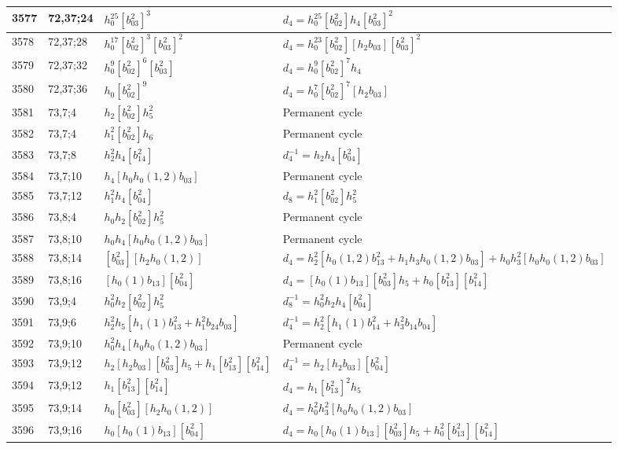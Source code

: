 \documentclass{article}
\begin{document}
\begin{longtable}{|l|l|>{\raggedright\arraybackslash}p{6cm}|>{\raggedright\arraybackslash}p{6cm}|}
\hline
3577 & 72,37;24 & $h_0^{25}[b_{03}^2]^3$ &$d_{4}=h_0^{25}[b_{02}^2]h_4[b_{03}^2]^2$\\
\hline
3578 & 72,37;28 & $h_0^{17}[b_{02}^2]^3[b_{03}^2]^2$ &$d_{4}=h_0^{23}[b_{02}^2][h_2b_{03}][b_{03}^2]^2$\\
\hline
3579 & 72,37;32 & $h_0^9[b_{02}^2]^6[b_{03}^2]$ &$d_{4}=h_0^9[b_{02}^2]^7h_4$\\
\hline
3580 & 72,37;36 & $h_0[b_{02}^2]^9$ &$d_{4}=h_0^7[b_{02}^2]^7[h_2b_{03}]$\\
\hline
3581 & 73,7;4 & $h_2[b_{02}^2]h_5^2$ & Permanent cycle\\
3582 & 73,7;4 & $h_1^2[b_{02}^2]h_6$ & Permanent cycle\\
\hline
3583 & 73,7;8 & $h_2^2h_4[b_{14}^2]$ & $d_{4}^{-1}=h_2h_4[b_{04}^2]$\\
\hline
3584 & 73,7;10 & $h_4[h_0h_0(1, 2)b_{03}]$ & Permanent cycle\\
\hline
3585 & 73,7;12 & $h_1^2h_4[b_{04}^2]$ &$d_{8}=h_1^2[b_{02}^2]h_5^2$\\
\hline
3586 & 73,8;4 & $h_0h_2[b_{02}^2]h_5^2$ & Permanent cycle\\
\hline
3587 & 73,8;10 & $h_0h_4[h_0h_0(1, 2)b_{03}]$ & Permanent cycle\\
\hline
3588 & 73,8;14 & $[b_{03}^2][h_2h_0(1, 2)]$ &$d_{4}=h_2^2[h_0(1, 2)b_{13}^2 + h_1h_3h_0(1, 2)b_{03}] + h_0h_3^2[h_0h_0(1, 2)b_{03}]$\\
\hline
3589 & 73,8;16 & $[h_0(1)b_{13}][b_{04}^2]$ &$d_{4}=[h_0(1)b_{13}][b_{03}^2]h_5 + h_0[b_{13}^2][b_{14}^2]$\\
\hline
3590 & 73,9;4 & $h_0^2h_2[b_{02}^2]h_5^2$ & $d_{8}^{-1}=h_0^2h_2h_4[b_{04}^2]$\\
\hline
3591 & 73,9;6 & $h_2^2h_5[h_1(1)b_{13}^2 + h_1^2b_{24}b_{03}]$ & $d_{4}^{-1}=h_2^2[h_1(1)b_{14}^2 + h_3^2b_{14}b_{04}]$\\
\hline
3592 & 73,9;10 & $h_0^2h_4[h_0h_0(1, 2)b_{03}]$ & Permanent cycle\\
\hline
3593 & 73,9;12 & $h_2[h_2b_{03}][b_{03}^2]h_5 + h_1[b_{13}^2][b_{14}^2]$ & $d_{4}^{-1}=h_2[h_2b_{03}][b_{04}^2]$\\
3594 & 73,9;12 & $h_1[b_{13}^2][b_{14}^2]$ &$d_{4}=h_1[b_{13}^2]^2h_5$\\
\hline
3595 & 73,9;14 & $h_0[b_{03}^2][h_2h_0(1, 2)]$ &$d_{4}=h_0^2h_3^2[h_0h_0(1, 2)b_{03}]$\\
\hline
3596 & 73,9;16 & $h_0[h_0(1)b_{13}][b_{04}^2]$ &$d_{4}=h_0[h_0(1)b_{13}][b_{03}^2]h_5 + h_0^2[b_{13}^2][b_{14}^2]$\\

\end{longtable}
\end{document}
